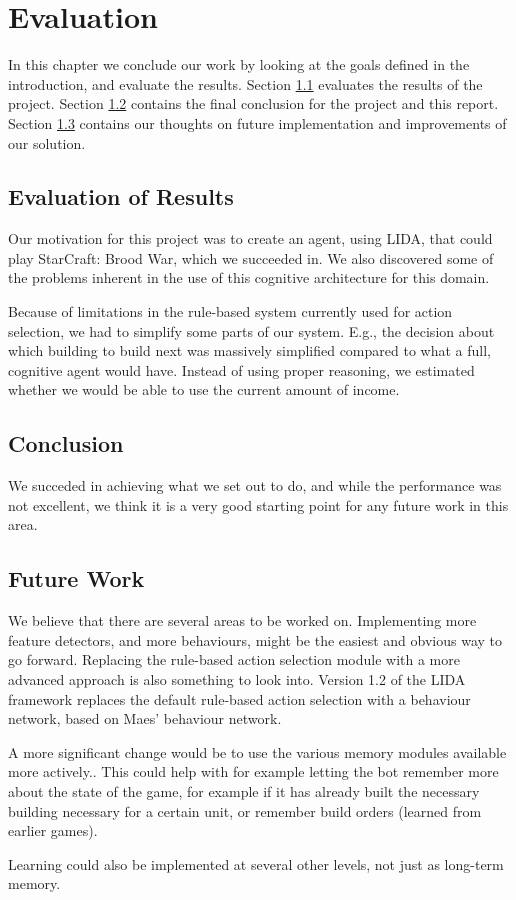 
\chapter{Evaluation}
In this chapter we conclude our work by looking at the goals defined in the
introduction, and evaluate the results.
Section \ref{sec:evalres} evaluates the results of the project.
Section \ref{sec:conclusion} contains the final conclusion for the project and this report. 
Section \ref{sec:futurework} contains our thoughts on future implementation and improvements of our solution.


\section{Evaluation of Results}
\label{sec:evalres}
Our motivation for this project was to create an agent, using LIDA, that could play StarCraft: Brood War, which we succeeded in. We also discovered some of the problems inherent in the use of this cognitive architecture for this domain.

Because of limitations in the rule-based system currently used for action selection, we had to simplify some parts of our system. E.g., the decision about which building to build next was massively simplified compared to what a full, cognitive agent would have. Instead of using proper reasoning, we estimated whether we would be able to use the current amount of income.

\section{Conclusion}
\label{sec:conclusion}
We succeded in achieving what we set out to do, and while the performance was not excellent, we think it is a very good starting point for any future work in this area.

\section{Future Work}
\label{sec:futurework}
We believe that there are several areas to be worked on. Implementing more feature detectors, and more behaviours, might be the easiest and obvious way to go forward. Replacing the rule-based action selection module with a more advanced approach is also something to look into. Version 1.2 of the LIDA framework replaces the default rule-based action selection with a behaviour network, based on Maes' behaviour network.\cite{maes1989right}

A more significant change would be to use the various memory modules available more actively.\cite{franklin2007lida}. This could help with for example letting the bot remember more about the state of the game, for example if it has already built the necessary building necessary for a certain unit, or remember build orders (learned from earlier games).

Learning could also be implemented at several other levels, not just as long-term memory.
